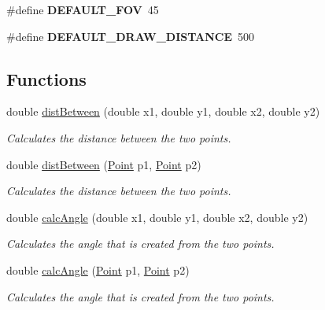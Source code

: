\begin{CompactItemize}
\item 
\hypertarget{group__userclasses_gb45bec6fad4f0c516372be64fcca1d73}{
\#define \textbf{DEFAULT\_\-FOV}~45}
\label{group__userclasses_gb45bec6fad4f0c516372be64fcca1d73}

\item 
\hypertarget{group__userclasses_g63edaa6d8261967e0152a272bb23398d}{
\#define \textbf{DEFAULT\_\-DRAW\_\-DISTANCE}~500}
\label{group__userclasses_g63edaa6d8261967e0152a272bb23398d}

\end{CompactItemize}
\subsection*{Functions}
\begin{CompactItemize}
\item 
double \hyperlink{group__userclasses_ge6b2f472cd9165b5d8b07d31fd3c9fbb}{distBetween} (double x1, double y1, double x2, double y2)
\begin{CompactList}\small\item\em Calculates the distance between the two points. \item\end{CompactList}\item 
double \hyperlink{group__userclasses_g562b039a8c671376bd5033fd3739fc7f}{distBetween} (\hyperlink{class_point}{Point} p1, \hyperlink{class_point}{Point} p2)
\begin{CompactList}\small\item\em Calculates the distance between the two points. \item\end{CompactList}\item 
double \hyperlink{group__userclasses_g959fe7935c86672e48b4ac47324411a8}{calcAngle} (double x1, double y1, double x2, double y2)
\begin{CompactList}\small\item\em Calculates the angle that is created from the two points. \item\end{CompactList}\item 
double \hyperlink{group__userclasses_gf0804c8504c8b48ce8a130a8b0727cf6}{calcAngle} (\hyperlink{class_point}{Point} p1, \hyperlink{class_point}{Point} p2)
\begin{CompactList}\small\item\em Calculates the angle that is created from the two points. \item\end{CompactList}\item 

\end{CompactItemize}
